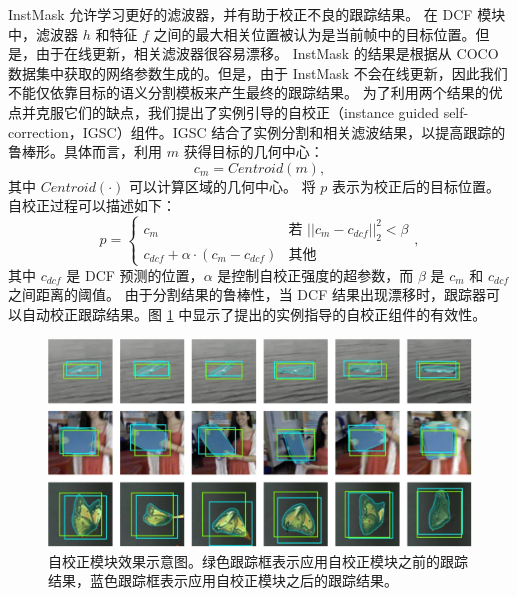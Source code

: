 InstMask 允许学习更好的滤波器，并有助于校正不良的跟踪结果。
在 DCF 模块中，滤波器 $h$ 和特征 $f$ 之间的最大相关位置被认为是当前帧中的目标位置。但是，由于在线更新，相关滤波器很容易漂移。
InstMask 的结果是根据从 COCO 数据集中获取的网络参数生成的。但是，由于 InstMask 不会在线更新，因此我们不能仅依靠目标的语义分割模板来产生最终的跟踪结果。
为了利用两个结果的优点并克服它们的缺点，我们提出了实例引导的自校正（instance guided self-correction，IGSC）组件。IGSC 结合了实例分割和相关滤波结果，以提高跟踪的鲁棒形。具体而言，利用 $m$ 获得目标的几何中心：
\begin{equation}
c_{m} = Centroid(m),
\end{equation}
其中 $Centroid(\mathord{\cdot})$ 可以计算区域的几何中心。
将 $p$ 表示为校正后的目标位置。
自校正过程可以描述如下：
\begin{equation}
p = \left\{ \begin{array}{ll}
 c_{m} & \textrm{若 $||c_{m}-c_{dcf}||_2^2 < \beta$}\\
 c_{dcf} + \alpha \cdot (c_{m}-c_{dcf}) & \textrm{其他}
 \end{array} \right.,
\end{equation}
其中 $c_{dcf}$ 是 DCF 预测的位置，$\alpha$ 是控制自校正强度的超参数，而 $\beta$ 是 $c_{m}$ 和 $c_{dcf}$ 之间距离的阈值。
由于分割结果的鲁棒性，当 DCF 结果出现漂移时，跟踪器可以自动校正跟踪结果。图 \ref{fig:IGSC} 中显示了提出的实例指导的自校正组件的有效性。

\begin{figure}
\centering
\includegraphics[width=1.0\textwidth]{Img/IGCF/cog.pdf}
\caption{自校正模块效果示意图。绿色跟踪框表示应用自校正模块之前的跟踪结果，蓝色跟踪框表示应用自校正模块之后的跟踪结果。}
\label{fig:IGSC}
\end{figure}

